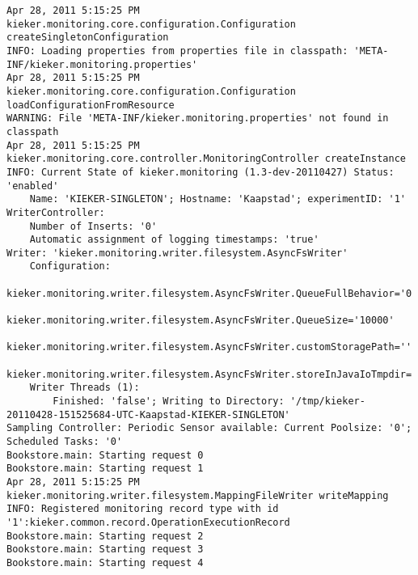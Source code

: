 \setTextListing
\begin{lstlisting}[caption=Execution of the manually instrumented Bookstore application (Section~\ref{sec:example:monitoring})]
Apr 28, 2011 5:15:25 PM kieker.monitoring.core.configuration.Configuration createSingletonConfiguration
INFO: Loading properties from properties file in classpath: 'META-INF/kieker.monitoring.properties'
Apr 28, 2011 5:15:25 PM kieker.monitoring.core.configuration.Configuration loadConfigurationFromResource
WARNING: File 'META-INF/kieker.monitoring.properties' not found in classpath
Apr 28, 2011 5:15:25 PM kieker.monitoring.core.controller.MonitoringController createInstance
INFO: Current State of kieker.monitoring (1.3-dev-20110427) Status: 'enabled'
	Name: 'KIEKER-SINGLETON'; Hostname: 'Kaapstad'; experimentID: '1'
WriterController:
	Number of Inserts: '0'
	Automatic assignment of logging timestamps: 'true'
Writer: 'kieker.monitoring.writer.filesystem.AsyncFsWriter'
	Configuration:
		kieker.monitoring.writer.filesystem.AsyncFsWriter.QueueFullBehavior='0'
		kieker.monitoring.writer.filesystem.AsyncFsWriter.QueueSize='10000'
		kieker.monitoring.writer.filesystem.AsyncFsWriter.customStoragePath=''
		kieker.monitoring.writer.filesystem.AsyncFsWriter.storeInJavaIoTmpdir='true'
	Writer Threads (1): 
		Finished: 'false'; Writing to Directory: '/tmp/kieker-20110428-151525684-UTC-Kaapstad-KIEKER-SINGLETON'
Sampling Controller: Periodic Sensor available: Current Poolsize: '0'; Scheduled Tasks: '0'
Bookstore.main: Starting request 0
Bookstore.main: Starting request 1
Apr 28, 2011 5:15:25 PM kieker.monitoring.writer.filesystem.MappingFileWriter writeMapping
INFO: Registered monitoring record type with id '1':kieker.common.record.OperationExecutionRecord
Bookstore.main: Starting request 2
Bookstore.main: Starting request 3
Bookstore.main: Starting request 4
\end{lstlisting}

